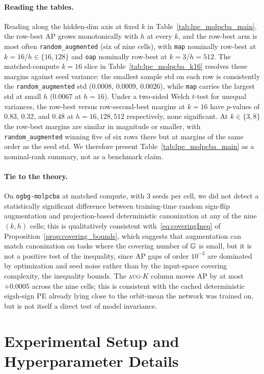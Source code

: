 \paragraph{Reading the tables.}
Reading along the hidden-dim axis at fixed $k$ in
Table~\ref{tab:lpe_molpcba_main}, the row-best AP grows monotonically
with $h$ at every $k$, and the row-best arm is most often
\texttt{random\_augmented} (six of nine cells), with \texttt{map}
nominally row-best at $k\!=\!16$/$h\!\in\!\{16,128\}$ and \texttt{oap}
nominally row-best at $k\!=\!3$/$h\!=\!512$. The matched-compute
$k\!=\!16$ slice in Table~\ref{tab:lpe_molpcba_k16} resolves these
margins against seed variance: the smallest sample std on each row
is consistently the \texttt{random\_augmented} std ($0.0008$,
$0.0009$, $0.0026$), while \texttt{map} carries the largest std at
small $h$ ($0.0067$ at $h\!=\!16$). Under a two-sided Welch
$t$-test for unequal variances, the row-best versus row-second-best
margins at $k\!=\!16$ have $p$-values of $0.83$, $0.32$, and $0.48$
at $h\!=\!16,128,512$ respectively, none significant. At $k\!\in\!\{3,8\}$
the row-best margins are similar in magnitude or smaller, with
\texttt{random\_augmented} winning five of six rows there but at
margins of the same order as the seed std. We therefore present
Table~\ref{tab:lpe_molpcba_main} as a nominal-rank summary, not as
a benchmark claim.

\paragraph{Tie to the theory.}
On \texttt{ogbg-molpcba} at matched compute, with $3$ seeds per cell,
we did not detect a statistically significant difference between
training-time random sign-flip augmentation and projection-based
deterministic canonization at any of the nine $(k,h)$ cells; this is
qualitatively consistent with~\eqref{eq:coveringIneq} of
Proposition~\ref{prop:covering_bounds}, which suggests that augmentation can match
canonization on tasks where the covering number of $\mathbb{G}$ is small,
but it is not a positive test of the inequality, since AP gaps of
order $10^{-3}$ are dominated by optimization and seed noise rather
than by the input-space covering complexity, the inequality bounds.
The \textsc{aug-$K$} column moves AP by at most $+0.0005$ across the
nine cells; this is consistent with the cached deterministic
eigsh-sign PE already lying close to the orbit-mean the network was
trained on, but is not itself a direct test of model invariance.

\section{Experimental Setup and Hyperparameter Details}
\label{app:exp_setup}

